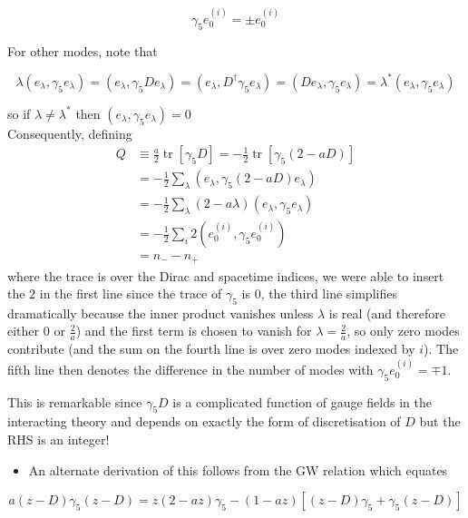 \begin{equation}
\gamma_{5} e_{0}^{(i)}= \pm e_{0}^{(i)}
\end{equation}

For other modes, note that

\begin{equation}
\lambda\left(e_{\lambda}, \gamma_{5} e_{\lambda}\right)=\left(e_{\lambda}, \gamma_{5} D e_{\lambda}\right)=\left(e_{\lambda}, D^{\dagger} \gamma_{5} e_{\lambda}\right)=\left(D e_{\lambda}, \gamma_{5} e_{\lambda}\right)=\lambda^{*}\left(e_{\lambda}, \gamma_{5} e_{\lambda}\right)
\end{equation}

so if \(\lambda \neq \lambda^{*}\) then \(\left(e_{\lambda}, \gamma_{5} e_{\lambda}\right)=0\)\\
Consequently, defining
\begin{align}
    Q &\equiv \frac{a}{2}\operatorname{tr}[\gamma_5 D] = -\frac{1}{2}\operatorname{tr}[\gamma_5(2-aD)] \nonumber\\
    &= -\frac{1}{2}\sum_\lambda (e_\lambda, \gamma_5(2-aD)e_\lambda) \nonumber\\
    &=-\frac{1}{2}\sum_\lambda(2-a\lambda)(e_\lambda, \gamma_5 e_\lambda) \nonumber\\
    &=-\frac{1}{2}\sum_i 2(e_0^{(i)}, \gamma_5e_0^{(i)}) \nonumber\\
    &= n_- - n_+
\end{align}
where the trace is over the Dirac and spacetime indices, we were able to insert the $2$ in the first line since the trace of $\gamma_5$ is $0$, the third line simplifies dramatically because the inner product vanishes unless $\lambda$ is real (and therefore either $0$ or $\frac{2}{a}$) and the first term is chosen to vanish for $\lambda = \frac{2}{a}$, so only zero modes contribute (and the sum on the fourth line is over zero modes indexed by $i$). The fifth line then denotes the difference in the number of modes with $\gamma_5 e_0^{(i)} = \mp 1$.

This is remarkable since \(\gamma_{5} D\) is a complicated function of gauge fields in the interacting theory and depends on exactly the form of discretisation of \(D\) but the RHS is an integer!

\begin{itemize}
  \item An alternate derivation of this follows from the GW relation which equates
\end{itemize}

\begin{equation}
a(z-D) \gamma_{5}(z-D)=z(2-a z) \gamma_{5}-(1-a z)\left[(z-D) \gamma_{5}+\gamma_{5}(z-D)\right]
\end{equation}

